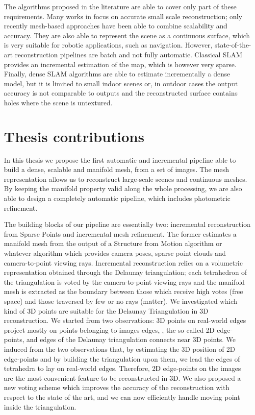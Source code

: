 The algorithms proposed in the literature are able to cover only part of these requirements.
Many works in \mvs focus on accurate small scale reconstruction; only recently mesh-based approaches have been able to combine scalability and accuracy. They are also able to represent the scene as  a continuous surface, which is very suitable for robotic applications, such as navigation.
However, state-of-the-art \mvs reconstruction pipelines are batch and not fully automatic. 
Classical SLAM provides an incremental estimation of the map, which is however very sparse.
Finally, dense SLAM algorithms are able to estimate incrementally a dense model, but it is limited to small indoor scenes or, in outdoor cases the output accuracy is not comparable to \mvs outputs and the reconstructed surface contains holes where the scene is untextured.

\section{Thesis contributions}
In this thesis we propose the first automatic and incremental pipeline able to build a dense, scalable and manifold mesh, from a set of images.
The mesh representation allows us  to reconstruct  large-scale scenes and continuous meshes.
By keeping the manifold property valid along the whole processing, we are also able to design a completely automatic pipeline, which includes photometric refinement.

The building blocks of our pipeline are essentially two: incremental reconstruction from Sparse Points and incremental mesh refinement.
The former estimates a  manifold mesh from the output of a Structure from Motion algorithm or whatever algorithm which provides camera poses, sparse point clouds and camera-to-point viewing rays.
Incremental reconstruction relies on a volumetric representation obtained through the Delaunay triangulation; each tetrahedron of the triangulation  is voted by the camera-to-point viewing rays and the manifold mesh is extracted as the boundary between those which receive high votes (free space) and those traversed by few or no rays (matter).
We investigated which kind of 3D points are suitable for the Delaunay Triangulation in 3D reconstruction.
We started from two observations: 3D points on real-world edges project mostly on  points belonging to images edges, \ie, the so called 2D edge-points, and edges of the Delaunay triangulation connects near 3D points.
We induced from the two observations that, by estimating the 3D position of 2D edge-points and by building the triangulation upon them, we lead the edges of tetrahedra  to lay on real-world edges.
Therefore, 2D edge-points on the images are the most convenient feature to be reconstructed in 3D.
We also proposed a new voting scheme which improves the accuracy of the reconstruction with respect to the state of the art, and we can now efficiently handle moving point inside the triangulation.

